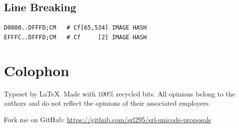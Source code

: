 \documentclass[12pt]{article}
\begin{document}
\subsection{Line Breaking}

\begin{verbatim}
D0000..DFFFD;CM   # Cf[65,534] IMAGE HASH                                                                                                                                         
EFFFC..DFFFD;CM   # Cf     [2] IMAGE HASH                                                                                                                                         
\end{verbatim}




{}
\printbibliography
\section*{Colophon}

Typeset by \LaTeX . Made with \( 100\%  \) recycled bits.
All opinions belong to the authors and do not reflect the opinions
of their associated employers.

Fork me on GitHub: \url{https://github.com/srl295/srl-unicode-proposals}
\end{document}

